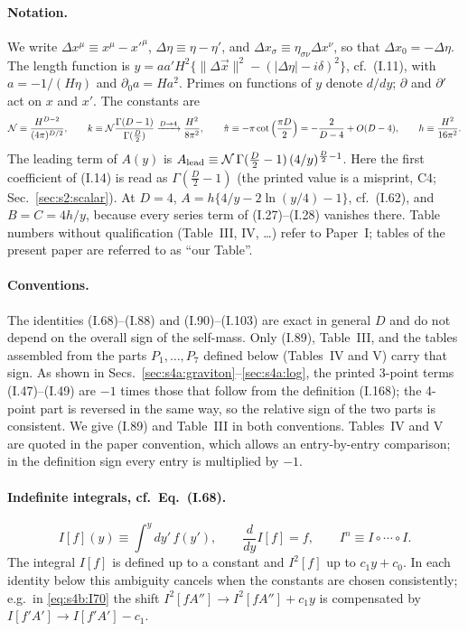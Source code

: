 \documentclass[aps,prd,onecolumn,10pt,nofootinbib,floatfix]{revtex4-2}
\newcommand{\PI}{Paper~I}
\newcommand{\eqI}[1]{(I.#1)}
\newcommand{\pihat}{\hat\pi}
\begin{document}
\paragraph*{Notation.}
We write $\Delta x^\mu\equiv x^\mu-x'^\mu$, $\Delta\eta\equiv\eta-\eta'$, and $\Delta x_\sigma\equiv\eta_{\sigma\nu}\Delta x^\nu$, so that
$\Delta x_0=-\Delta\eta$. The length function is
$y=aa'H^2\{\|\Delta\vec x\|^2-(|\Delta\eta|-i\delta)^2\}$, cf.\ \eqI{11}, with $a=-1/(H\eta)$ and $\partial_0a=Ha^2$.
Primes on functions of $y$ denote $d/dy$; $\partial$ and $\partial'$ act on $x$ and $x'$. The constants are
\begin{equation}
\mathcal N\equiv\frac{H^{D-2}}{(4\pi)^{D/2}},\qquad
k\equiv\mathcal N\frac{\Gamma(D-1)}{\Gamma(\frac D2)}\xrightarrow{D\to4}\frac{H^2}{8\pi^2},\qquad
\pihat\equiv-\pi\cot\Big(\frac{\pi D}{2}\Big)=-\frac{2}{D-4}+\sivbO(D-4),\qquad
h\equiv\frac{H^2}{16\pi^2}.
\label{eq:s4b:constants}
\end{equation}
The leading term of $A(y)$ is $A_{\rm lead}\equiv\mathcal N\,\Gamma(\frac D2-1)\,(4/y)^{\frac D2-1}$. Here the first coefficient
of \eqI{14} is read as $\Gamma(\frac D2-1)$ (the printed value is a misprint, C4; Sec.~\ref{sec:s2:scalar}). At $D=4$, $A=h\{4/y-2\ln(y/4)-1\}$, cf.\ \eqI{62}, and $B=C=4h/y$, because every
series term of \eqI{27}--\eqI{28} vanishes there. Table numbers without qualification (Table~III, IV, \dots) refer to
\PI; tables of the present paper are referred to as ``our Table''.

\paragraph*{Conventions.}
The identities \eqI{68}--\eqI{88} and \eqI{90}--\eqI{103} are exact in general $D$ and do not depend on the overall
sign of the self-mass. Only \eqI{89}, Table~III, and the tables assembled from the parts $P_1,\dots,P_7$ defined
below (Tables~IV and V) carry that sign. As shown in Secs.~\ref{sec:s4a:graviton}--\ref{sec:s4a:log}, the printed 3-point terms
\eqI{47}--\eqI{49} are $-1$ times those that follow from the definition \eqI{168}; the 4-point part is reversed in
the same way, so the relative sign of the two parts is consistent. We give \eqI{89} and Table~III in both
conventions. Tables~IV and V are quoted in the paper convention, which allows an entry-by-entry comparison; in the
definition sign every entry is multiplied by $-1$.

\paragraph*{Indefinite integrals, cf.\ Eq.~(I.68).}
\begin{equation}
I[f](y)\equiv\int^y\!dy'\,f(y'),\qquad \frac{d}{dy}I[f]=f,\qquad I^n\equiv I\circ\cdots\circ I .
\label{eq:s4b:Idef}
\end{equation}
The integral $I[f]$ is defined up to a constant and $I^2[f]$ up to $c_1y+c_0$. In each identity below this ambiguity cancels
when the constants are chosen consistently; e.g.\ in \eqref{eq:s4b:I70} the shift
$I^2[fA'']\to I^2[fA'']+c_1y$ is compensated by $I[f'A']\to I[f'A']-c_1$.
\end{document}
